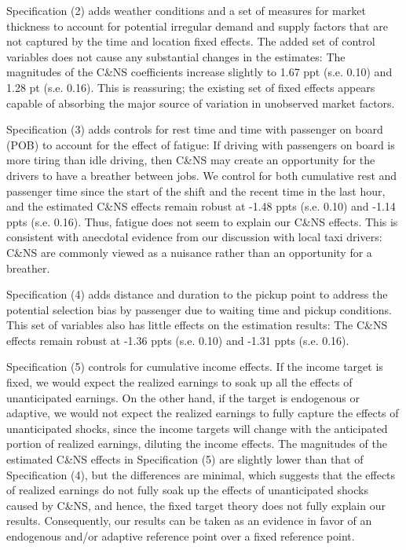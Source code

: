 \documentclass[reviewmode,AEJ]{AEA}
\begin{document}
Specification (2) adds weather conditions and a set of measures for market thickness to account for potential irregular demand and supply factors that are not captured by the time and location fixed effects. The added set of control variables does not cause any substantial changes in the estimates: The magnitudes of the C\&NS coefficients increase slightly to 1.67 ppt (s.e. 0.10) and 1.28 pt (s.e. 0.16). This is reassuring; the existing set of fixed effects appears capable of absorbing the major source of variation in unobserved market factors.

Specification (3) adds controls for rest time and time with passenger on board (POB) to account for the effect of fatigue: If driving with passengers on board is more tiring than idle driving, then C\&NS may create an opportunity for the drivers to have a breather between jobs. We control for both cumulative rest and passenger time since the start of the shift and the recent time in the last hour, and the estimated C\&NS effects remain robust at -1.48 ppts (s.e. 0.10) and -1.14 ppts (s.e. 0.16). Thus, fatigue does not seem to explain our C\&NS effects. This is consistent with anecdotal evidence from our discussion with local taxi drivers: C\&NS are commonly viewed as a nuisance rather than an opportunity for a breather.

Specification (4) adds distance and duration to the pickup point to address the potential selection bias by passenger due to waiting time and pickup conditions. This set of variables also has little effects on the estimation results: The C\&NS effects remain robust at -1.36 ppts (s.e. 0.10) and -1.31 ppts (s.e. 0.16).

Specification (5) controls for cumulative income effects. If the income target is fixed, we would expect the realized earnings to soak up all the effects of unanticipated earnings. On the other hand, if the target is endogenous or adaptive, we would not expect the realized earnings to fully capture the effects of unanticipated shocks, since the income targets will change with the anticipated portion of realized earnings, diluting the income effects. The magnitudes of the estimated C\&NS effects in Specification (5) are slightly lower than that of Specification (4), but the differences %
are minimal, which suggests that the effects of realized earnings do not fully soak up the effects of unanticipated shocks caused by C\&NS, and hence, the fixed target theory does not fully explain our results. Consequently, our results can be taken as an evidence in favor of an endogenous and/or adaptive reference point over a fixed reference point. 
\end{document}

